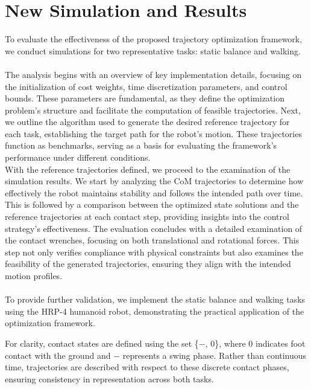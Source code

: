 \documentclass[main.tex]{subfiles}
\begin{document}
\begin{sloppypar}
\section{New Simulation and Results}
\label{sec:newsimulation}
To evaluate the effectiveness of the proposed trajectory optimization framework, we conduct simulations for two representative tasks: static balance and walking. \\ 
\\
The analysis begins with an overview of key implementation details, focusing on the initialization of cost weights, time discretization parameters, and control bounds. These parameters are fundamental, as they define the optimization problem’s structure and facilitate the computation of feasible trajectories. Next, we outline the algorithm used to generate the desired reference trajectory for each task, establishing the target path for the robot’s motion. These trajectories function as benchmarks, serving as a basis for evaluating the framework’s performance under different conditions. \\
With the reference trajectories defined, we proceed to the examination of the simulation results. We start by analyzing the CoM trajectories to determine how effectively the robot maintains stability and follows the intended path over time. This is followed by a comparison between the optimized state solutions and the reference trajectories at each contact step, providing insights into the control strategy’s effectiveness. The evaluation concludes with a detailed examination of the contact wrenches, focusing on both translational and rotational forces. This step not only verifies compliance with physical constraints but also examines the feasibility of the generated trajectories, ensuring they align with the intended motion profiles. \\
\\
To provide further validation, we implement the static balance and walking tasks using the HRP-4 humanoid robot, demonstrating the practical application of the optimization framework. 
\begin{remark}
    For clarity, contact states are defined using the set \{$-$, $0$\}, where $0$ indicates foot contact with the ground and $-$ represents a swing phase. Rather than continuous time, trajectories are described with respect to these discrete contact phases, ensuring consistency in representation across both tasks.
\end{remark}

\end{sloppypar}
\end{document}
